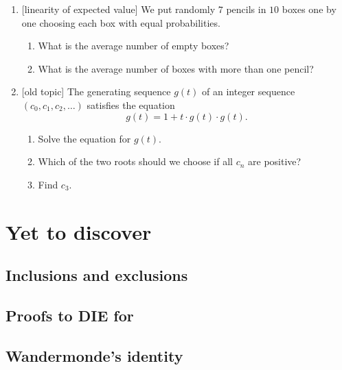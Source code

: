 \documentclass[12pt]{article}
\begin{document}
\begin{enumerate}
    \begin{enumerate}[label=\alph*)]
        \item Draw an example of such a graph.
        \item You have $10$ colours available. In how many ways can you color the vertices of this graph if adjacent vertices should be painted differently?
    \end{enumerate}

        
    \item {[linearity of expected value]} We put randomly $7$ pencils in $10$ boxes one by one choosing each box with equal probabilities.
\begin{enumerate}[label=\alph*)]
  \item What is the average number of empty boxes?
  \item What is the average number of boxes with more than one pencil?
\end{enumerate}


    \item {[old topic]} The generating sequence $g(t)$ of an integer sequence $(c_0, c_1, c_2, \dots)$ satisfies the equation 
    \[
    g(t) = 1 + t \cdot g(t) \cdot g(t).
    \]
    \begin{enumerate}
        \item Solve the equation for $g(t)$.
        \item Which of the two roots should we choose if all $c_n$ are positive?
        \item Find $c_3$.
    \end{enumerate}


\end{enumerate}


\section{Yet to discover}


\subsection*{Inclusions and exclusions}


\subsection*{Proofs to DIE for}



\subsection*{Wandermonde's identity}
\end{document}
